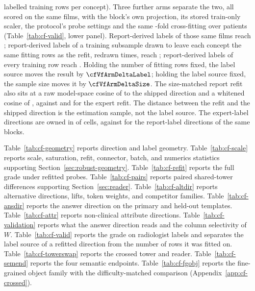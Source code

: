 \documentclass{article}
\begin{document}
\cfVfArmReportFullRows{} labelled training rows per concept). Three further arms separate the two, all scored on the same films, with the block's own projection, its stored train-only scaler, the protocol's probe settings and the same \cfVfArmFolds{}-fold cross-fitting over patients (Table~\ref{tab:cf-valid}, lower panel). Report-derived labels of those same \cfVfArmRows{} films reach \cfVfArmReportSameFilmsAuroc{}; report-derived labels of a training subsample drawn to leave each concept the same \cfVfArmReportSubRows{} fitting rows as the refit, redrawn \cfVfArmDraws{} times, reach \cfVfArmReportSubAuroc{}; report-derived labels of every training row reach \cfVfArmReportFullAuroc{}. Holding the number of fitting rows fixed, the label source moves the result by $\cfVfArmDeltaLabel$; holding the label source fixed, the sample size moves it by $\cfVfArmDeltaSize$. The size-matched report refit also sits at a raw model-space cosine of \cfVfArmReportSubCos{} to the shipped direction and a whitened cosine of \cfVfArmReportSubCosWhite{}, against \cfVfArmExpertCos{} and \cfVfArmExpertCosWhite{} for the expert refit. The distance between the refit and the shipped direction is the estimation sample, not the label source. The expert-label directions are owned in \cfValidfitOwnedExpert{} of \cfValidfitCells{} cells, against \cfValidfitOwnedReport{} for the report-label directions of the same blocks.

Table~\ref{tab:cf-geometry} reports direction and label geometry. Table~\ref{tab:cf-scale} reports scale, saturation, refit, connector, batch, and numerics statistics supporting Section~\ref{sec:robust-geometry}. Table~\ref{tab:cf-refit} reports the full grade under refitted probes. Table~\ref{tab:cf-pairs} reports paired shared-tower differences supporting Section~\ref{sec:reader}. Table~\ref{tab:cf-altdir} reports alternative directions, lifts, token weights, and competitor families. Table~\ref{tab:cf-ansdir} reports the answer direction on the primary and held-out templates. Table~\ref{tab:cf-attr} reports non-clinical attribute directions. Table~\ref{tab:cf-validation} reports what the answer direction reads and the column selectivity of $W$. Table~\ref{tab:cf-valid} reports the grade on radiologist labels and separates the label source of a refitted direction from the number of rows it was fitted on. Table~\ref{tab:cf-towerswap} reports the crossed tower and reader. Table~\ref{tab:cf-semend} reports the four semantic endpoints. Table~\ref{tab:cf-fgobj} reports the fine-grained object family with the difficulty-matched comparison (Appendix~\ref{app:cf-crossed}).
\end{document}
